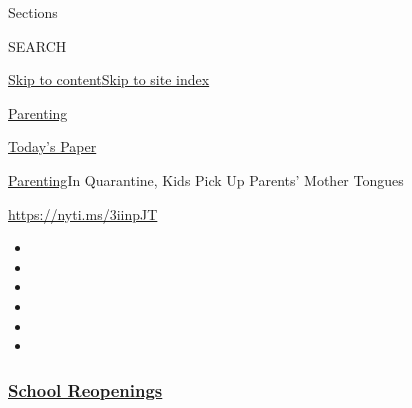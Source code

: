 Sections

SEARCH

\protect\hyperlink{site-content}{Skip to
content}\protect\hyperlink{site-index}{Skip to site index}

\href{https://www.nytimes3xbfgragh.onion/section/parenting}{Parenting}

\href{https://myaccount.nytimes3xbfgragh.onion/auth/login?response_type=cookie\&client_id=vi}{}

\href{https://www.nytimes3xbfgragh.onion/section/todayspaper}{Today's
Paper}

\href{/section/parenting}{Parenting}\textbar{}In Quarantine, Kids Pick
Up Parents' Mother Tongues

\url{https://nyti.ms/3iinpJT}

\begin{itemize}
\item
\item
\item
\item
\item
\item
\end{itemize}

\hypertarget{school-reopenings}{%
\subsubsection{\texorpdfstring{\href{https://www.nytimes3xbfgragh.onion/spotlight/schools-reopening?name=styln-coronavirus-schools-reopening\&region=TOP_BANNER\&block=storyline_menu_recirc\&action=click\&pgtype=Article\&impression_id=03e480f0-f4bb-11ea-be14-1f129ac58728\&variant=undefined}{School
Reopenings}}{School Reopenings}}\label{school-reopenings}}

